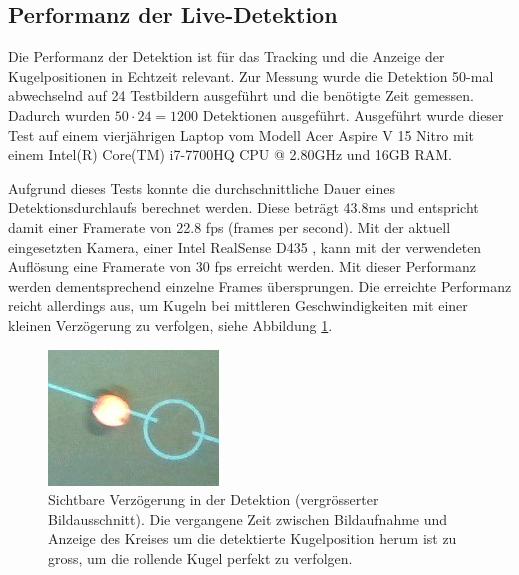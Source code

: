 \subsection{Performanz der Live-Detektion}
Die Performanz der Detektion ist für das Tracking und die Anzeige der Kugelpositionen in Echtzeit relevant.
Zur Messung wurde die Detektion 50-mal abwechselnd auf 24 Testbildern ausgeführt und die benötigte Zeit gemessen.
Dadurch wurden $50 \cdot 24 = 1200$ Detektionen ausgeführt.
Ausgeführt wurde dieser Test auf einem vierjährigen Laptop vom Modell Acer Aspire V 15 Nitro mit
einem Intel(R) Core(TM) i7-7700HQ CPU @ 2.80GHz und 16GB RAM.

Aufgrund dieses Tests konnte die durchschnittliche Dauer eines Detektionsdurchlaufs berechnet werden.
Diese beträgt 43.8ms und entspricht damit einer Framerate von 22.8 fps (frames per second).
Mit der aktuell eingesetzten Kamera, einer Intel RealSense D435 \cite{project2:aufbau}, kann mit der verwendeten Auflösung eine Framerate von
30 fps erreicht werden.
Mit dieser Performanz werden dementsprechend einzelne Frames übersprungen.
Die erreichte Performanz reicht allerdings aus, um Kugeln bei mittleren Geschwindigkeiten mit einer kleinen Verzögerung
zu verfolgen, siehe Abbildung \ref{fig:detection_delay}.

\begin{figure}[h!]
    \begin{center}
        \includegraphics[width=0.4\linewidth]{../common/04_results/resources/detection_delay.jpg}
    \end{center}
    \caption{
        Sichtbare Verzögerung in der Detektion (vergrösserter Bildausschnitt).
        Die vergangene Zeit zwischen Bildaufnahme und Anzeige des Kreises um die detektierte Kugelposition herum ist zu gross,
        um die rollende Kugel perfekt zu verfolgen.
    }
    \label{fig:detection_delay}
\end{figure}

